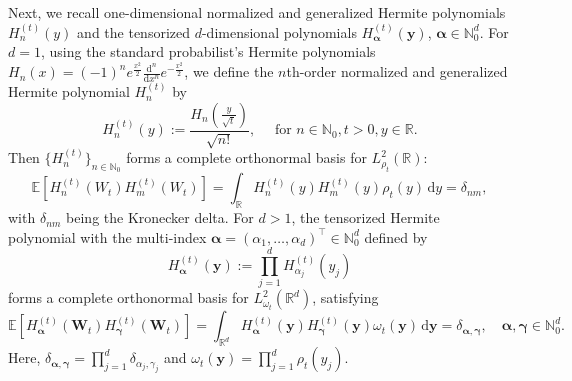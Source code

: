 \documentclass[10pt,a4paper]{amsart}
\numberwithin{equation}{section}
\numberwithin{algorithm}{section}
\theoremstyle{plain}
\theoremstyle{remark}
\newcommand{\R}{\mathbb{R}}
\newcommand{\dd}{\mathrm{d}}
\begin{document}
Next, we recall one-dimensional normalized and generalized Hermite polynomials $H_n^{(t)}(y)$ and the tensorized $d$-dimensional polynomials $H_{\bm{\alpha}}^{(t)}(\mathbf{y})$, $\bm{\alpha} \in \mathbb{N}_0^d$. For $d = 1$, using the standard probabilist’s Hermite polynomials $H_n(x) = (-1)^n e^{\frac{x^2}{2}} \frac{\dd^n}{\dd x^n}e^{-\frac{x^2}{2}}$, we define the  $n$th-order normalized and generalized Hermite polynomial $H_n^{(t)}$ by
\begin{equation*}
    H_n^{(t)}(y) := \frac{H_n(\frac{y}{\sqrt{t}})}{\sqrt{n!}}, \quad \text{ for } n\in\mathbb{N}_0, t>0, y\in \R.
\end{equation*}
Then $\{H_n^{(t)}\}_{n\in \mathbb{N}_0}$ forms a complete orthonormal basis for ${L}^2_{\rho_{t}}(\R)$:
\begin{equation*}
    \mathbb{E}\left[ H_n^{(t)}(W_t) H_m^{(t)}(W_t) \right] = \int_\R H_n^{(t)}(y) H_m^{(t)}(y) \rho_t(y) \,\mathrm{d}y = \delta_{nm},
\end{equation*}
with $\delta_{nm}$ being the Kronecker delta.
For $d>1$, the tensorized Hermite polynomial with the multi-index $\bm{\alpha}=(\alpha_1,\ldots,\alpha_d)^\top \in \mathbb{N}_0^d$ defined by
\begin{equation*}
    H_{\bm{\alpha}}^{(t)}(\mathbf{y}) := \prod_{j=1}^d H_{\alpha_j}^{(t)}(y_j)
\end{equation*}
forms a complete orthonormal basis for ${L}^2_{\omega_{t}}(\R^d)$, satisfying
\begin{equation*}
    \mathbb{E}\left[ H_{\bm{\alpha}}^{(t)}(\mathbf{W}_t) H_{\bm{\gamma}}^{(t)}(\mathbf{W}_t) \right] = \int_{\R^d} H_{\bm{\alpha}}^{(t)}(\mathbf{y}) H_{\bm{\gamma}}^{(t)}(\mathbf{y})\omega_{t}(\bm{y}) \,\mathrm{d}\mathbf{y} = \delta_{\bm{\alpha}, \bm{\gamma}}, \quad \bm{\alpha}, \bm{\gamma} \in \mathbb{N}_0^d.
\end{equation*}
Here, $\delta_{\bm{\alpha}, \bm{\gamma}} = \prod_{j=1}^d \delta_{\alpha_j,\gamma_j}$ and
$\omega_{t}(\bm{y})=\prod_{j=1}^d \rho_t(y_j) $.
\end{document}
